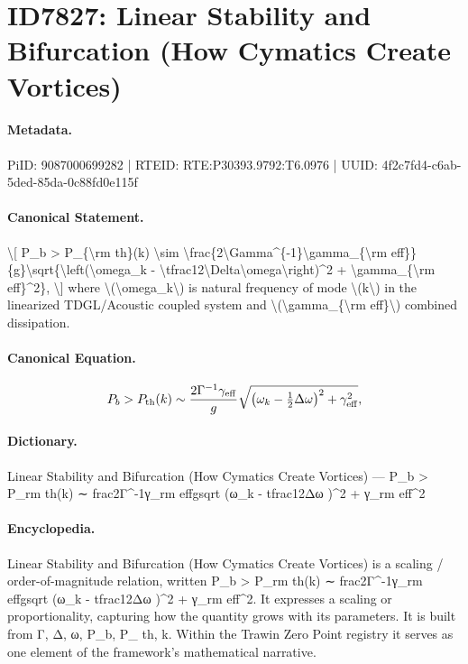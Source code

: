 \section*{ID7827: Linear Stability and Bifurcation (How Cymatics Create Vortices)}
\paragraph{Metadata.}
PiID: 9087000699282 | RTEID: RTE:P30393.9792:T6.0976 | UUID: 4f2c7fd4-c6ab-5ded-85da-0c88fd0e115f

\paragraph{Canonical Statement.}
\textbackslash{}[ P\_b > P\_\{\textbackslash{}rm th\}(k) \textbackslash{}sim \textbackslash{}frac\{2\textbackslash{}Gamma\textasciicircum{}\{-1\}\textbackslash{}gamma\_\{\textbackslash{}rm eff\}\}\{g\}\textbackslash{}sqrt\{\textbackslash{}left(\textbackslash{}omega\_k - \textbackslash{}tfrac12\textbackslash{}Delta\textbackslash{}omega\textbackslash{}right)\textasciicircum{}2 + \textbackslash{}gamma\_\{\textbackslash{}rm eff\}\textasciicircum{}2\}, \textbackslash{}] where \textbackslash{}(\textbackslash{}omega\_k\textbackslash{}) is natural frequency of mode \textbackslash{}(k\textbackslash{}) in the linearized TDGL/Acoustic coupled system and \textbackslash{}(\textbackslash{}gamma\_\{\textbackslash{}rm eff\}\textbackslash{}) combined dissipation.

\paragraph{Canonical Equation.}
\[
P_b > P_{\rm th}(k) \sim \frac{2\Gamma^{-1}\gamma_{\rm eff}}{g}\sqrt{\left(\omega_k - \tfrac12\Delta\omega\right)^2 + \gamma_{\rm eff}^2},
\]

\paragraph{Dictionary.}
Linear Stability and Bifurcation (How Cymatics Create Vortices) — P\_b > P\_rm th(k) ∼ frac2Γ\textasciicircum{}-1γ\_rm effgsqrt (ω\_k - tfrac12Δω )\textasciicircum{}2 + γ\_rm eff\textasciicircum{}2

\paragraph{Encyclopedia.}
Linear Stability and Bifurcation (How Cymatics Create Vortices) is a scaling / order-of-magnitude relation, written P\_b > P\_rm th(k) ∼ frac2Γ\textasciicircum{}-1γ\_rm effgsqrt (ω\_k - tfrac12Δω )\textasciicircum{}2 + γ\_rm eff\textasciicircum{}2. It expresses a scaling or proportionality, capturing how the quantity grows with its parameters. It is built from Γ, Δ, ω, P\_b, P\_ th, k. Within the Trawin Zero Point registry it serves as one element of the framework's mathematical narrative.
